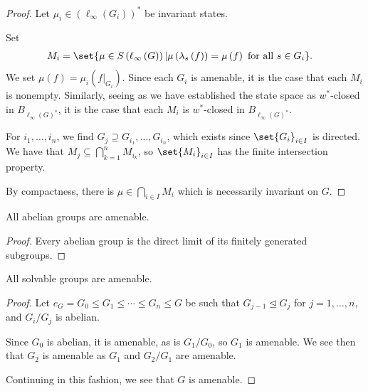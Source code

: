 \begin{proof}
  Let $\mu_i\in \left(\ell_{\infty}\left(G_i\right)\right)^{\ast}$ be invariant states.\newline

  Set
  \begin{align*}
    M_i &= \set{\mu\in S\left(\ell_{\infty}\left(G\right)\right)| \mu\left(\lambda_s\left(f\right)\right) = \mu\left(f\right)\text{ for all }s\in G_i}.
  \end{align*}
  We set $\mu\left(f\right) = \mu_i\left(f|_{G_i}\right)$. Since each $G_i$ is amenable, it is the case that each $M_i$ is nonempty. Similarly, seeing as we have established the state space as $w^{\ast}$-closed in $B_{\ell_{\infty}\left(G\right)^{\ast}}$, it is the case that each $M_i$ is $w^{\ast}$-closed in $B_{\ell_{\infty}\left(G\right)^{\ast}}$.\newline

  For $i_1,\dots,i_n$, we find $G_j \supseteq G_{i_1},\dots,G_{i_n}$, which exists since $\set{G_i}_{i\in I}$ is directed. We have that $M_j\subseteq \bigcap_{k=1}^{n}M_{i_k}$, so $\set{M_i}_{i\in I}$ has the finite intersection property.\newline

  By compactness, there is $\mu\in \bigcap_{i\in I}M_i$ which is necessarily invariant on $G$.
\end{proof}
\begin{corollary}\label{cor:abelian_groups_amenable}
  All abelian groups are amenable.
\end{corollary}
\begin{proof}
  Every abelian group is the direct limit of its finitely generated subgroups.
\end{proof}
\begin{corollary}\label{cor:solvable_groups_amenable}
  All solvable groups are amenable.
\end{corollary}
\begin{proof}
  Let $e_G = G_0 \leq G_1\leq\cdots\leq G_n\leq G$ be such that $G_{j-1}\trianglelefteq G_j$ for $j=1,\dots,n$, and $G_i/G_j$ is abelian.\newline

  Since $G_0$ is abelian, it is amenable, as is $G_1/G_0$, so $G_1$ is amenable. We see then that $G_2$ is amenable as $G_1$ and $G_2/G_1$ are amenable.\newline

  Continuing in this fashion, we see that $G$ is amenable.
\end{proof}
